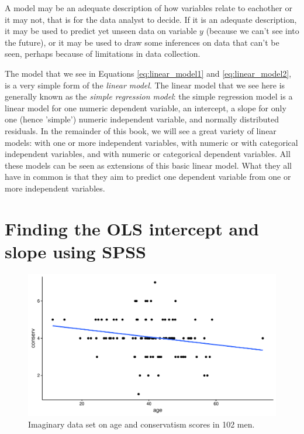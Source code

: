 \documentclass[]{book}\usepackage[]{graphicx}\usepackage[]{color}
\makeatletter
\def\maxwidth{ %
  \ifdim\Gin@nat@width>\linewidth
    \linewidth
  \else
    \Gin@nat@width
  \fi
}
\newenvironment{knitrout}{}{} %
\makeatother
\begin{document}
A model may be an adequate description of how variables relate to eachother or it may not, that is for the data analyst to decide. If it is an adequate description, it may be used to predict yet unseen data on variable $y$ (because we can't see into the future), or it may be used to draw some inferences on data that can't be seen, perhaps because of limitations in data collection. 

The model that we see in Equations \ref{eq:linear_model1} and \ref{eq:linear_model2}, is a very simple form of the \textit{linear model}. The linear model that we see here is generally known as the \textit{simple regression model}: the simple regression model is a linear model for one numeric dependent variable, an intercept, a slope for only one (hence 'simple') numeric independent variable, and normally distributed residuals. In the remainder of this book, we will see a great variety of linear models: with one or more independent variables, with numeric or with categorical independent variables, and with numeric or categorical dependent variables. All these models can be seen as extensions of this basic linear model. What they all have in common is that they aim to predict one dependent variable from one or more independent variables.


\section{Finding the OLS intercept and slope using SPSS}

\begin{knitrout}
\color{fgcolor}\begin{figure}

{\centering \includegraphics[width=\maxwidth]{figure/lm_22-1} 

}

\caption[Imaginary data set on age and conservatism scores in 102 men]{Imaginary data set on age and conservatism scores in 102 men.}\label{fig:lm_22}
\end{figure}


\end{knitrout}
\end{document}
